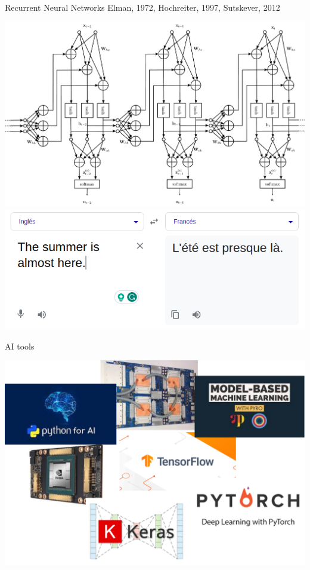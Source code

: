 \documentclass{beamer}
\begin{document}
\begin{frame}{Recurrent Neural Networks}
Elman, 1972, Hochreiter, 1997, Sutskever, 2012

\begin{center}
\includegraphics[scale=0.1]{pics/rnn_unrolled.pdf}
\includegraphics[scale=0.2]{pics/google_translate.png}
\end{center}
\vspace{-0.5 cm}


\end{frame}


\begin{frame}{AI tools}

\begin{center}
    \includegraphics[scale=0.4]{pics/AI_tools.pdf}
\end{center}    
\end{frame}
\end{document}
